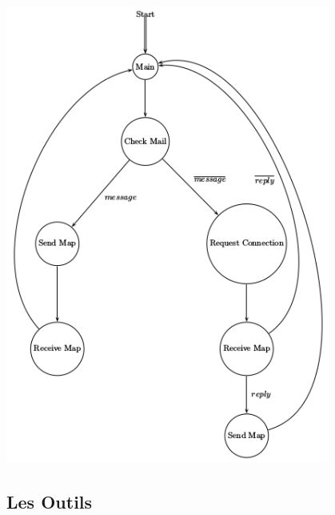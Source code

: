 \documentclass[10pt]{article}
\begin{document}
\begin{center}
	\includegraphics[width=0.8\textwidth]{extend.png}
\end{center}

\subsection{Les Outils}
\end{document}

